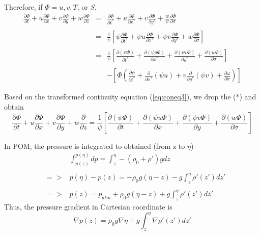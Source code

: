 \documentclass[oribibl]{llncs}
\begin{document}
Therefore, if $\Phi=u,v,T$, or $S$,
\begin{eqnarray}
\frac{\partial \Phi}{\partial t}+u\frac{\partial \Phi}{\partial x} + v\frac{\partial \Phi}{\partial y}+w\frac{\partial \Phi}{\partial z} &=& \frac{\partial \Phi}{\partial t^*}+u\frac{\partial \Phi}{\partial x^*} + v\frac{\partial \Phi}{\partial y^*}+\frac{w}{\psi}\frac{\partial \Phi}{\partial \sigma} \nonumber \\ \nonumber \\ 
&=& \frac{1}{\psi} \left[  \psi\frac{\partial \Phi}{\partial t^*}+\psi u\frac{\partial \Phi}{\partial x^*} + \psi v\frac{\partial \Phi}{\partial y^*}+w\frac{\partial \Phi}{\partial \sigma}  \right]  \nonumber \\ \nonumber \\ 
&=& \frac{1}{\psi} \left[  \frac{\partial (\psi\Phi)}{\partial t^*}+\frac{\partial (\psi u\Phi)}{\partial x^*} + \frac{\partial (\psi v\Phi)}{\partial y^*}+\frac{\partial (w\Phi)}{\partial \sigma}  \right]   \nonumber \\ \nonumber \\ 
&& - \left[ \Phi \left( \frac{\partial \psi}{\partial t^*}+\frac{\partial}{\partial x^*}(\psi u) + v\frac{\partial }{\partial y^*}(\psi v)+\frac{\partial \omega}{\partial \sigma} \right) \right] 
\end{eqnarray}


Based on the transformed continuity equation (\ref{eq:coneq3}), we drop the (*) and obtain
\begin{equation}
\frac{\partial \Phi}{\partial t}+u\frac{\partial \Phi}{\partial x} + v\frac{\partial \Phi}{\partial y}+w\frac{\partial}{\partial z} =  \frac{1}{\psi} \left[  \frac{\partial (\psi\Phi)}{\partial t}+\frac{\partial (\psi u\Phi)}{\partial x} + \frac{\partial (\psi v\Phi)}{\partial y}+\frac{\partial (w\Phi)}{\partial \sigma}  \right] 
\end{equation}

In POM, the pressure is integrated to obtained (from z to  $\eta $)
\begin{eqnarray}
&&\int_{p(z)}^{p(\eta)} dp = \int_z^\eta -(\rho_0 + \rho' )g dz \nonumber \\ \nonumber \\ 
&=>& p(\eta)-p(z) =-\rho_0 g (\eta - z) -g \int_z^\eta \rho'(z') dz' \nonumber \\ \nonumber \\ 
&=>& p(z) = p_{atm}+\rho_0 g (\eta - z) +g \int_z^\eta \rho'(z') dz'
\end{eqnarray}
Thus, the pressure gradient in Cartesian coordinate is 
\begin{equation}\label{eq:p1}
\nabla p(z) = \rho_0 g \nabla \eta  +g\int_z^\eta \nabla \rho'(z') dz'
\end{equation}
\end{document}
